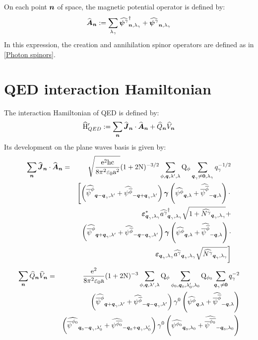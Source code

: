 \documentclass[10pt,a4paper,twoside,openany]{book}
\begin{document}
On each point $\n$ of space, the magnetic potential operator is defined by:
\begin{equation*}
\Aop \n \eqdef \sum_{\sp_\photon} \tSCop \photon \n {\sp_\photon} + \tSAop \photon \n {\sp_\photon}
\end{equation*}
In this expression, the creation and annihilation spinor operators are defined as in \ref{Photon spinors}.

\section{QED interaction Hamiltonian}
\label{QED interaction Hamiltonian}

The interaction Hamiltonian of QED is defined by:
\begin{equation*}
\HopQED \eqdef \sum_{\n} \Jop \n \ssp \Aop \n + \Qop \n \Vop \n
\end{equation*}
Its development on the plane waves basis is given by:
\begin{eqnarray*}
\sum_{\n} \Jop \n \ssp \Aop \n & = & \sqrt{\frac{\e^2 \h \c}{8 \pi^2 \vpty \a^2}} ( 1 + 2 \N )^{-3/2} \sum_{\pt, \q, \sp', \sp} \Qp \pt \sum_{\q_\photon \neq \sv 0, \sp_\photon} q_\photon^{-1/2} \\
&& \left[ \left( \SCop \pt {\q - \q_\photon} {\sp'} + \SAop {\antiparticle \pt} {-\q + \q_\photon} {\sp'} \right) \gamvec \left( \SAop \pt \q \sp + \SCop {\antiparticle \pt} {-\q} \sp \right) \ssp \right. \\
&& \cphotonspin {\q_\photon} {\sp_\photon} \cop \photon {\q_\photon} {\sp_\photon} \sqrt{1 + \Nop \photon {\q_\photon} {\sp_\photon}} + \\
&& \left( \SCop \pt {\q + \q_\photon} {\sp'} + \SAop {\antiparticle \pt} {-\q - \q_\photon} {\sp'} \right) \gamvec \left( \SAop \pt \q \sp + \SCop {\antiparticle \pt} {-\q} \sp \right) \ssp \\
&& \left. \photonspin {\q_\photon} {\sp_\photon} \aop \photon {\q_\photon} {\sp_\photon} \sqrt{\Nop \photon {\q_\photon} {\sp_\photon}} \right]
\end{eqnarray*}
\begin{eqnarray*}
\sum_{\n} \Qop \n \Vop \n & = & \frac{\e^2}{8 \pi^2 \vpty \a} ( 1 + 2 \N )^{-3} \sum_{\pt,\q,\sp',\sp} \Qp \pt \sum_{\pt_0,\q_0,\sp'_0,\sp_0} \Qp {\pt_0} \sum_{\q_\photon \neq \sv 0} q_\photon^{-2} \\
&& \left( \SCop \pt {\q + \q_\photon} {\sp'} + \SAop {\antiparticle \pt} {-\q - \q_\photon} {\sp'} \right) \gammat 0 \left( \SAop \pt \q \sp + \SCop {\antiparticle \pt} {-\q} \sp \right) \\
&& \left( \SCop {\pt_0} {\q_0 - \q_\photon} {\sp'_0} + \SAop {\antiparticle {\pt_0}} {-\q_0 + \q_\photon} {\sp'_0} \right) \gammat 0 \left( \SAop {\pt_0} {\q_0} {\sp_0} + \SCop {\antiparticle {\pt_0}} {-\q_0} {\sp_0} \right)
\end{eqnarray*}
\end{document}
